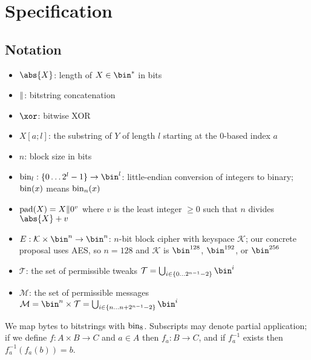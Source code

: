 \documentclass[hctr.tex]{subfiles}
\begin{document}
\section{Specification}\label{specification}
\subsection{Notation}
\begin{itemize}
    \item $\abs{X}$: length of $X \in \bin^{*}$ in bits
    \item $\Vert$: bitstring concatenation
    \item \(\xor\): bitwise XOR
    \item $X[a;l]$: the substring of $Y$ of length $l$ starting at the 0-based index $a$
    \item \(n\): block size in bits
    \item $\fromint_l: \{0 \ldots 2^l-1\} \rightarrow \bin^l$:
    little-endian conversion of integers to binary; 
    \(\operatorname{bin}(x)\) means \(\operatorname{bin}_n(x)\)
    \item $\operatorname{pad}(X) = X \Vert 0^v$
    where $v$ is the least integer $\geq 0$ such that $n$ divides $\abs{X} + v$
    \item \(E: \mathcal{K} \times \bin^n \rightarrow \bin^n\): 
    \(n\)-bit block cipher with keyspace \(\mathcal{K}\);
    our concrete proposal uses AES\cite{aes},
    so \(n=128\) and \(\mathcal{K}\) is
    \(\bin^{128}\), \(\bin^{192}\), or \(\bin^{256}\)
    \item \(\mathcal{T}\): the set of permissible tweaks
    \(\mathcal{T} = \bigcup_{i \in \{0\ldots2^{n-1}-2\}}\bin^i\)
    \item \(\mathcal{M}\): the set of permissible messages
    \(\mathcal{M} = \bin^n \times \mathcal{T} = \bigcup_{i \in \{n\ldots n + 2^{n-1}-2\}}\bin^i\)
\end{itemize}
We map bytes to bitstrings with \(\operatorname{bin}_8\). Subscripts may denote partial application; if we define $f: A \times B \rightarrow C$ and
$a \in A$ then $f_a: B \rightarrow C$, and if $f_a^{-1}$ exists then $f_a^{-1}(f_a(b)) = b$.
\end{document}
